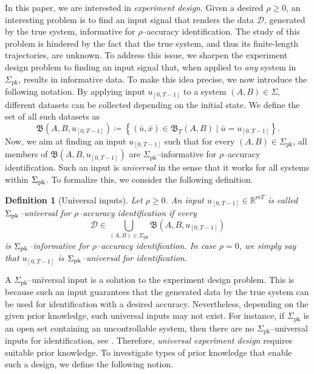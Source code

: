 \documentclass[journal,twoside,web]{ieeecolor}
\newcommand{\set}[2]{\left\{#1 \mid #2\right\}}
\newtheorem{definition}[theorem]{Definition}
\begin{document}
In this paper, we are interested in \emph{experiment design}. Given a desired $\rho \geq 0$, an interesting problem is to find an input signal that renders the data $\mathcal{D}$, generated by the true system, informative for $\rho$--accuracy identification. The study of this problem is hindered by the fact that the true system, and thus its finite-length trajectories, are unknown. To address this issue, we sharpen the experiment design problem to finding an input signal that, when applied to \emph{any} system in $\Sigma_\text{pk}$, results in informative data. To make this idea precise, we now introduce the following notation. By applying input $u_{[0,T-1]}$ to a system $(A,B)\in\Sigma$, different datasets can be collected depending on the initial state. We define the set of all such datasets as
\begin{equation}
\mathfrak{B}(A,B,u_{[0,T-1]})\coloneqq\set{(\bar{u},\bar{x})\in\mathfrak{B}_T(A,B)}{\bar{u}=u_{[0,T-1]}}.
\end{equation}
Now, we aim at finding an input $u_{[0,T-1]}$ such that for every $(A,B)\in\Sigma_\text{pk}$, all members of $\mathfrak{B}(A,B,u_{[0,T-1]})$ are \mbox{$\Sigma_\text{pk}$--informative} for $\rho$--accuracy identification. Such an input is \emph{universal} in the sense that it works for all systems within $\Sigma_\textup{pk}$. To formalize this, we consider the following definition.

\begin{definition}[Universal inputs]
\label{def:universal_experiment_noisy}
Let $\rho\geq0$. An input \mbox{$u_{[0,T-1]}\in\mathbb{R}^{mT}$} is called \emph{$\Sigma_\textup{pk}$--universal for $\rho$--accuracy identification} if every 
\begin{equation}
\mathcal{D}\in \bigcup_{(A,B)\in\Sigma_\text{pk}}\mathfrak{B}(A,B,u_{[0,T-1]})
\end{equation}
is $\Sigma_\textup{pk}$--informative for $\rho$--accuracy identification. In case \mbox{$\rho=0$}, we simply say that $u_{[0,T-1]}$ is \emph{$\Sigma_\textup{pk}$--universal for identification}.
\end{definition}

A $\Sigma_\text{pk}$--universal input is a solution to the experiment design problem. This is because such an input guarantees that the generated data by the true system can be used for identification with a desired accuracy. Nevertheless, depending on the given prior knowledge, such universal inputs may not exist.  For instance, if $\Sigma_\text{pk}$ is an open set containing an uncontrollable system, then there are no $\Sigma_\text{pk}$--universal inputs for identification, see \cite[Thm. 8]{shakouri2025exp}. Therefore, \emph{universal experiment design} requires suitable prior knowledge. To investigate types of prior knowledge that enable such a design, we define the following notion.  %
\end{document}
